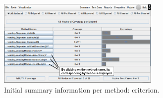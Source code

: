 
\begin{figure}[!ht]
\begin{center}
\includegraphics[width=0.70\textwidth]{fig/summary-by-method-initial.eps}
\caption{\label{fig:initial-summary-method} Initial summary
information per method:  criterion.}
\end{center}
\end{figure}
